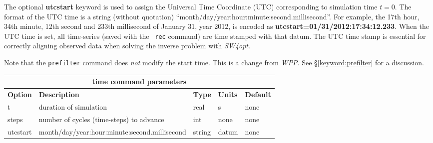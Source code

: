 \documentclass[11pt]{report}
\begin{document}
The optional {\bf utcstart} keyword is used to assign the Universal Time Coordinate (UTC)
corresponding to simulation time $t=0$. The format of the UTC time is a string (without quotation)
``month/day/year:hour:minute:second.millisecond''. For example, the 17th hour, 34th minute, 12th
second and 233th millisecond of January 31, year 2012, is encoded as {\bf
  utcstart=01/31/2012:17:34:12.233}. When the UTC time is set, all time-series (saved with the {\tt
  rec} command) are time stamped with that datum. The UTC time stamp is essential for correctly
aligning observed data when solving the inverse problem with \emph{SW4opt}.

Note that the \verb+prefilter+ command does {\it not} modify the start time. This is a change from
\emph{WPP}. See \S\ref{keyword:prefilter} for a discussion.
%
\begin{center}
\begin{tabular}{|l|p{8cm}|l|l|l|} \hline
\multicolumn{5}{|c|}{\bf time command parameters}\\ \hline
{\bf Option} & {\bf Description} & {\bf Type} & {\bf Units} & {\bf Default} \\ \hline \hline
t & duration of simulation & real & s	& none \\ \hline
steps & number of cycles (time-steps) to advance & int & none & none\\ \hline
utcstart & month/day/year:hour:minute:second.millisecond & string & datum & none\\ \hline
\end{tabular}
\end{center}

\end{document}
